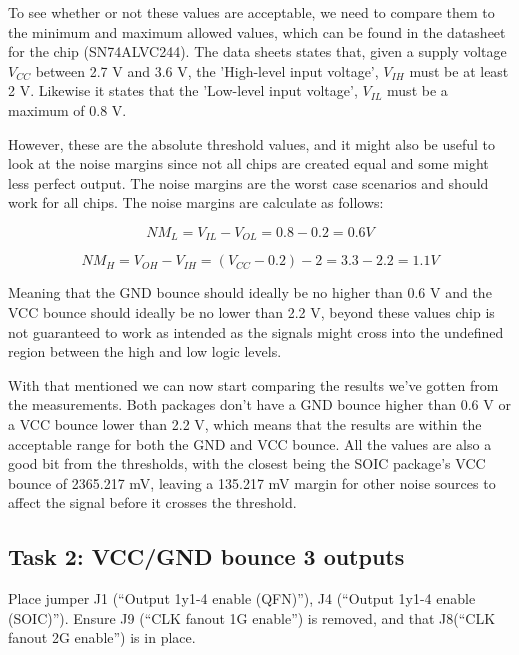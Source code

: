 \documentclass[../main.tex]{subfiles}
\begin{document}
To see whether or not these values are acceptable, we need to compare them to the minimum and maximum allowed values, which can be found in the datasheet for the chip (SN74ALVC244). The data sheets states that, given a supply voltage $V_{CC}$ between 2.7 V and 3.6 V, the 'High-level input voltage', $V_{IH}$ must be at least 2 V. Likewise it states that the 'Low-level input voltage', $V_{IL}$ must be a maximum of 0.8 V. 

However, these are the absolute threshold values, and it might also be useful to look at the noise margins since not all chips are created equal and some might less perfect output. The noise margins are the worst case scenarios and should work for all chips. The noise margins are calculate as follows:

\begin{equation*}
    NM_{L} = V_{IL} - V_{OL} = 0.8 - 0.2 = 0.6 V
\end{equation*}

\begin{equation*}
    NM_{H} = V_{OH} - V_{IH} = (V_{CC} - 0.2) - 2 = 3.3 - 2.2 = 1.1 V
\end{equation*}

Meaning that the GND bounce should ideally be no higher than 0.6 V and the VCC bounce should ideally be no lower than 2.2 V, beyond these values chip is not guaranteed to work as intended as the signals might cross into the undefined region between the high and low logic levels.

\vspace{10pt}

With that mentioned we can now start comparing the results we've gotten from the measurements. Both packages don't have a GND bounce higher than 0.6 V or a VCC bounce lower than 2.2 V, which means that the results are within the acceptable range for both the GND and VCC bounce. All the values are also a good bit from the thresholds, with the closest being the SOIC package's VCC bounce of 2365.217 mV, leaving a 135.217 mV margin for other noise sources to affect the signal before it crosses the threshold.

\subsection{Task 2: VCC/GND bounce 3 outputs}

Place jumper J1 (“Output 1y1-4 enable (QFN)”), J4 (“Output 1y1-4 enable (SOIC)”). Ensure J9 (“CLK fanout 1G enable”) is removed, and that J8(“CLK fanout 2G enable”) is in place.
\end{document}
